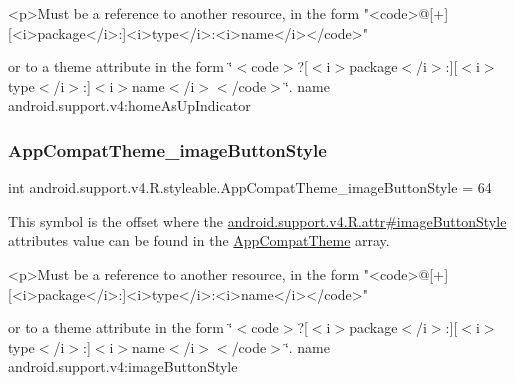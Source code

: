 \begin{DoxyVerb}      <p>Must be a reference to another resource, in the form "<code>@[+][<i>package</i>:]<i>type</i>:<i>name</i></code>"
\end{DoxyVerb}
 or to a theme attribute in the form \char`\"{}$<$code$>$?\mbox{[}$<$i$>$package$<$/i$>$\+:\mbox{]}\mbox{[}$<$i$>$type$<$/i$>$\+:\mbox{]}$<$i$>$name$<$/i$>$$<$/code$>$\char`\"{}.  name android.\+support.\+v4\+:home\+As\+Up\+Indicator \mbox{\label{classandroid_1_1support_1_1v4_1_1R_1_1styleable_a549f21c88298e5099c63f6caa601fafb}} 
\subsubsection{\texorpdfstring{App\+Compat\+Theme\+\_\+image\+Button\+Style}{AppCompatTheme\_imageButtonStyle}}
{\footnotesize\ttfamily int android.\+support.\+v4.\+R.\+styleable.\+App\+Compat\+Theme\+\_\+image\+Button\+Style = 64\hspace{0.3cm}{\ttfamily [static]}}

This symbol is the offset where the \hyperlink{classandroid_1_1support_1_1v4_1_1R_1_1attr_af6785bda01a49bcd1c0eec8a98ad437d}{android.\+support.\+v4.\+R.\+attr\#image\+Button\+Style} attribute\textquotesingle{}s value can be found in the \hyperlink{classandroid_1_1support_1_1v4_1_1R_1_1styleable_ac07ebbe62ed977f6dcaadc6397840ace}{App\+Compat\+Theme} array.

\begin{DoxyVerb}      <p>Must be a reference to another resource, in the form "<code>@[+][<i>package</i>:]<i>type</i>:<i>name</i></code>"
\end{DoxyVerb}
 or to a theme attribute in the form \char`\"{}$<$code$>$?\mbox{[}$<$i$>$package$<$/i$>$\+:\mbox{]}\mbox{[}$<$i$>$type$<$/i$>$\+:\mbox{]}$<$i$>$name$<$/i$>$$<$/code$>$\char`\"{}.  name android.\+support.\+v4\+:image\+Button\+Style \mbox{\label{classandroid_1_1support_1_1v4_1_1R_1_1styleable_a08f9b1ee1dd8bb92832fce16a96ae03f}} 
